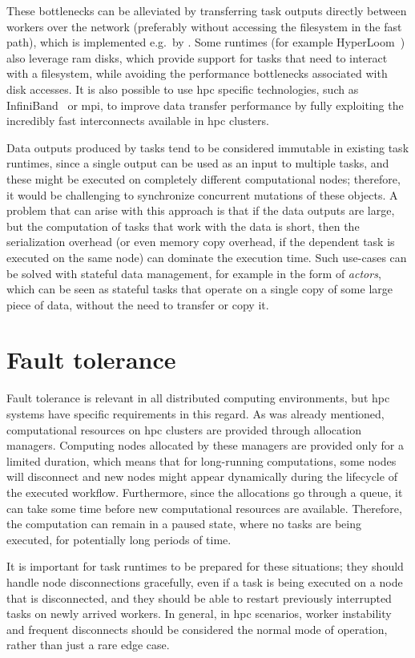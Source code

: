 These bottlenecks can be alleviated by transferring task outputs directly between workers over the
network (preferably without accessing the filesystem in the fast path), which is implemented e.g.\
by \dask{}. Some runtimes (for example HyperLoom~\cite{hyperloom})
also leverage \gls{ram} disks, which provide support for tasks that need to
interact with a filesystem, while avoiding the performance bottlenecks associated with disk
accesses. It is also possible to use \gls{hpc} specific technologies, such as
InfiniBand~\cite{infiniband} or \gls{mpi}, to improve data transfer
performance by fully exploiting the incredibly fast interconnects available in
\gls{hpc} clusters.

Data outputs produced by tasks tend to be considered immutable in existing task runtimes, since a
single output can be used as an input to multiple tasks, and these might be executed on completely
different computational nodes; therefore, it would be challenging to synchronize concurrent
mutations of these objects. A problem that can arise with this approach is that if the data outputs
are large, but the computation of tasks that work with the data is short, then the serialization
overhead (or even memory copy overhead, if the dependent task is executed on the same node) can
dominate the execution time. Such use-cases can be solved with stateful data management, for
example in the form of \emph{actors}, which can be seen as stateful tasks that
operate on a single copy of some large piece of data, without the need to transfer or copy it.

\section{Fault tolerance}
Fault tolerance is relevant in all distributed computing environments, but
\gls{hpc} systems have specific requirements in this regard. As was already
mentioned, computational resources on \gls{hpc} clusters are provided through
allocation managers. Computing nodes allocated by these managers are provided only for a limited
duration, which means that for long-running computations, some nodes will disconnect and new nodes
might appear dynamically during the lifecycle of the executed workflow. Furthermore, since the
allocations go through a queue, it can take some time before new computational resources are
available. Therefore, the computation can remain in a paused state, where no tasks are being
executed, for potentially long periods of time.

It is important for task runtimes to be prepared for these situations; they should handle node
disconnections gracefully, even if a task is being executed on a node that is disconnected, and
they should be able to restart previously interrupted tasks on newly arrived workers. In general,
in \gls{hpc} scenarios, worker instability and frequent disconnects should be
considered the normal mode of operation, rather than just a rare edge case.

